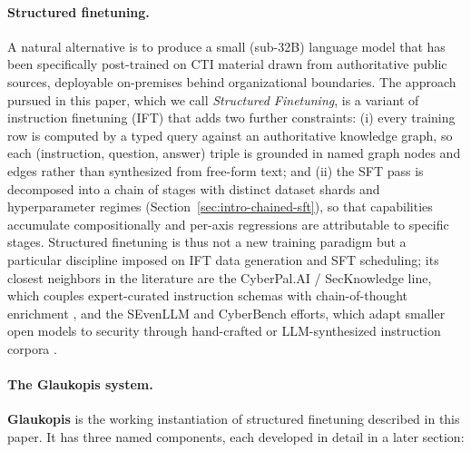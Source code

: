 \documentclass[unnumsec,webpdf,contemporary,large]{oup-authoring-template}
\theoremstyle{thmstyleone}
\theoremstyle{thmstyletwo}
\theoremstyle{thmstylethree}
\begin{document}
\paragraph{Structured finetuning.}
A natural alternative is to produce a small (sub-32B) language model that has been specifically post-trained on CTI material drawn from authoritative public sources, deployable on-premises behind organizational boundaries. The approach pursued in this paper, which we call \textit{Structured Finetuning}, is a variant of instruction finetuning (IFT) \cite{wei2022flan,ouyang2022instructgpt,chung2022flant5} that adds two further constraints: (i) every training row is computed by a typed query against an authoritative knowledge graph, so each (instruction, question, answer) triple is grounded in named graph nodes and edges rather than synthesized from free-form text; and (ii) the SFT pass is decomposed into a chain of stages with distinct dataset shards and hyperparameter regimes (Section~\ref{sec:intro-chained-sft}), so that capabilities accumulate compositionally and per-axis regressions are attributable to specific stages. Structured finetuning is thus not a new training paradigm but a particular discipline imposed on IFT data generation and SFT scheduling; its closest neighbors in the literature are the CyberPal.AI / SecKnowledge line, which couples expert-curated instruction schemas with chain-of-thought enrichment \cite{levi2024cyberpal,levi2025toward}, and the SEvenLLM and CyberBench efforts, which adapt smaller open models to security through hand-crafted or LLM-synthesized instruction corpora \cite{ji2024sevenllm,liu2024cyberbench}.

\paragraph{The Glaukopis system.}
\textbf{Glaukopis} is the working instantiation of structured finetuning described in this paper. It has three named components, each developed in detail in a later section:
\end{document}
